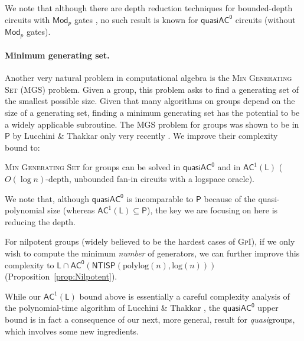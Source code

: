 \documentclass{theoretics}
\newcommand{\algprobm}[1]{\textsc{#1}\xspace}
\newcommand*{\ComplexityClass}[1]{\ensuremath{\mathsf{#1}}\xspace}
\renewcommand{\P}{\ComplexityClass{P}}
\newcommand{\NTISP}{\ComplexityClass{NTISP}}
\newcommand{\NTISPpll}{\ensuremath{\NTISP(\mathrm{polylog}(n),\mathrm{log}(n))}\xspace}
\newcommand*{\LogSpace}{\ComplexityClass{L}}
\newcommand{\AC}{\ComplexityClass{AC}}
\newcommand{\ACz}{\ComplexityClass{AC^0}}
\newcommand{\qACz}{\ComplexityClass{quasiAC^0}}
\begin{document}
\begin{table}[!htbp]
\caption{\label{table:history} History of the low-level circuit complexity of algorithms for \algprobm{(Quasi)Group Isomorphism} based on the generator-enumerator technique. For non-circuit classes, we list their depth as the best-known depth of their simulation by circuits. The class in our bound is contained in all the other classes listed in the table. Although depth 4 in our result does not follow from the complexity class as listed here, it follows from the more exact class we use in Theorem~\ref{thm:QuasigroupIsoPolylogtime}. }
\end{table}

We note that although there are depth reduction techniques for bounded-depth circuits with $\mathsf{Mod}_p$ gates  \cite{AllenderH94}, no such result is known for $\qACz$ circuits (without $\mathsf{Mod}_p$ gates).

\paragraph{Minimum generating set.} Another very natural problem in computational algebra is the \algprobm{Min Generating Set} (\algprobm{MGS}) problem. Given a group, this problem asks to find a generating set of the smallest possible size. Given that many algorithms on groups depend on the size of a generating set, finding a minimum generating set has the potential to be a widely applicable subroutine. The \algprobm{MGS} problem for groups was shown to be in $\P$ by Lucchini \& Thakkar only very recently \cite{LucchiniThakkar}. We improve their complexity bound to:

\begin{theorem}
\algprobm{Min Generating Set} for groups can be solved in $\qACz$ and in $\mathsf{AC}^1(\LogSpace)$ ($O(\log n)$-depth, unbounded fan-in circuits with a logspace oracle).
\end{theorem}

\noindent We note that, although $\qACz$ is incomparable to $\P$ because of the quasi-polynomial size (whereas $\AC^1(\LogSpace) \subseteq \P$), the key we are focusing on here is reducing the depth. 

For nilpotent groups (widely believed to be the hardest cases of \algprobm{GpI}), if we only wish to compute the minimum \emph{number} of generators, we can further improve this complexity to $\LogSpace \cap \ACz(\NTISPpll)$ (Proposition~\ref{prop:Nilpotent}).

While our $\AC^1(\LogSpace)$ bound above is essentially a careful complexity analysis of the polynomial-time algorithm of Lucchini \& Thakkar \cite{LucchiniThakkar}, the $\qACz$ upper bound is in fact a consequence of our next, more general, result for \emph{quasi}groups, which involves some new ingredients.
\end{document}
